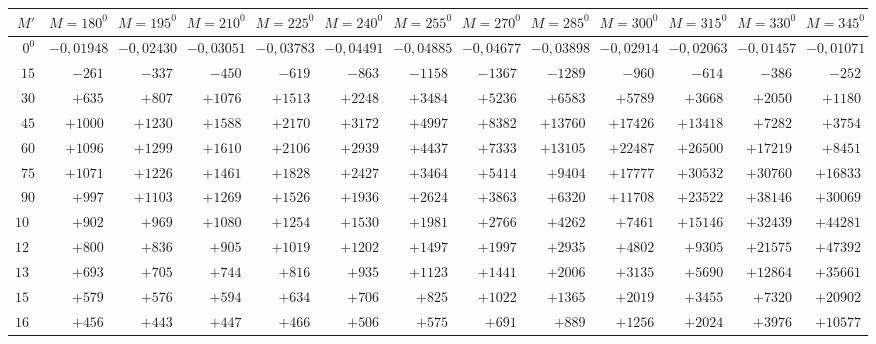 \begin{landscape}
\clearpage
\begin{center}
\begin{tabular}{@{}r|*{11}{r|}r@{}}
\hline
\(M'\) & \(M=180^0\) & \(M=195^0\) & \(M=210^0\) & \(M=225^0\) & \(M=240^0\) & \(M=255^0\) & \(M=270^0\) & \(M=285^0\) & \(M=300^0\) & \(M=315^0\) & \(M=330^0\) & \(M=345^0\)\\
\hline
\(0^0\) & \(-0{,}01948\) & \(-0{,}02430\) & \(-0{,}03051\) & \(-0{,}03783\) & \(-0{,}04491\) & \(-0{,}04885\) & \(-0{,}04677\) & \(-0{,}03898\) & \(-0{,}02914\) & \(-0{,}02063\) & \(-0{,}01457\) & \(-0{,}01071\)\\
\(15\) & \(-261\) & \(-337\) & \(-450\) & \(-619\) & \(-863\) & \(-1158\) & \(-1367\) & \(-1289\) & \(-960\) & \(-614\) & \(-386\) & \(-252\)\\
\(30\) & \(+635\) & \(+807\) & \(+1076\) & \(+1513\) & \(+2248\) & \(+3484\) & \(+5236\) & \(+6583\) & \(+5789\) & \(+3668\) & \(+2050\) & \(+1180\)\\
\(45\) & \(+1000\) & \(+1230\) & \(+1588\) & \(+2170\) & \(+3172\) & \(+4997\) & \(+8382\) & \(+13760\) & \(+17426\) & \(+13418\) & \(+7282\) & \(+3754\)\\
\(60\) & \(+1096\) & \(+1299\) & \(+1610\) & \(+2106\) & \(+2939\) & \(+4437\) & \(+7333\) & \(+13105\) & \(+22487\) & \(+26500\) & \(+17219\) & \(+8451\)\\
\(75\) & \(+1071\) & \(+1226\) & \(+1461\) & \(+1828\) & \(+2427\) & \(+3464\) & \(+5414\) & \(+9404\) & \(+17777\) & \(+30532\) & \(+30760\) & \(+16833\)\\
\(90\) & \(+997\) & \(+1103\) & \(+1269\) & \(+1526\) & \(+1936\) & \(+2624\) & \(+3863\) & \(+6320\) & \(+11708\) & \(+23522\) & \(+38146\) & \(+30069\)\\
\(105\) & \(+902\) & \(+969\) & \(+1080\) & \(+1254\) & \(+1530\) & \(+1981\) & \(+2766\) & \(+4262\) & \(+7461\) & \(+15146\) & \(+32439\) & \(+44281\)\\
\(120\) & \(+800\) & \(+836\) & \(+905\) & \(+1019\) & \(+1202\) & \(+1497\) & \(+1997\) & \(+2935\) & \(+4802\) & \(+9305\) & \(+21575\) & \(+47392\)\\
\(135\) & \(+693\) & \(+705\) & \(+744\) & \(+816\) & \(+935\) & \(+1123\) & \(+1441\) & \(+2006\) & \(+3135\) & \(+5690\) & \(+12864\) & \(+35661\)\\
\(150\) & \(+579\) & \(+576\) & \(+594\) & \(+634\) & \(+706\) & \(+825\) & \(+1022\) & \(+1365\) & \(+2019\) & \(+3455\) & \(+7320\) & \(+20902\)\\
\(165\) & \(+456\) & \(+443\) & \(+447\) & \(+466\) & \(+506\) & \(+575\) & \(+691\) & \(+889\) & \(+1256\) & \(+2024\) & \(+3976\) & \(+10577\)\\

\end{tabular}
\end{center}
\end{landscape}
